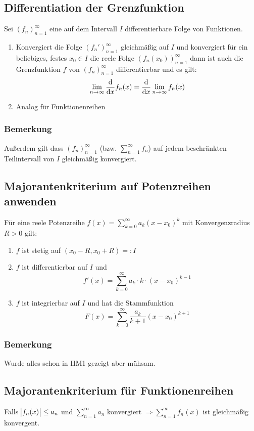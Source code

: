 \subsection{Differentiation der Grenzfunktion}
Sei ${(f_n)}_{n=1}^\infty$ eine auf dem Intervall $I$ differentierbare Folge von
Funktionen.
\begin{enumerate}[label= (\alph*)]
    \item Konvergiert die Folge ${(f_n')}_{n=1}^\infty$ gleichmäßig auf $I$ und konvergiert
    für ein beliebiges, festes $x_0 \in I$ die reele Folge ${(f_n(x_0))}_{n=1}^\infty$
    dann ist auch die Grenzfunktion $f$ von ${(f_n)}_{n=1}^\infty$ differentierbar
    und es gilt:
    \begin{equation*}
        \lim_{n \rightarrow \infty} \dfrac{\text{d}}{\text{d}x} f_n(x) = \dfrac{\text{d}}{\text{d}x} \lim_{n \rightarrow \infty} f_n(x)
    \end{equation*}
    \item Analog für Funktionenreihen
\end{enumerate}

\subsubsection{Bemerkung}
Außerdem gilt dass ${(f_n)}_{n=1}^\infty$ (bzw. $\sum_{n=1}^\infty f_n$) auf jedem
beschränkten Teilintervall von $I$ gleichmäßig konvergiert.

\subsection{Majorantenkriterium auf Potenzreihen anwenden}
Für eine reele Potenzreihe $f(x) = \sum_{k=0}^\infty a_k {(x-x_0)}^k$ mit
Konvergenzradius $R > 0$ gilt:
\begin{enumerate}[label= (\alph*)]
    \item $f$ ist stetig auf $(x_0 - R, x_0 + R) =: I$
    \item $f$ ist differentierbar auf $I$ und
        \begin{equation*}
            f'(x) = \sum_{k=0}^\infty a_k \cdot k \cdot {(x-x_0)}^{k-1}
        \end{equation*}
    \item $f$ ist integrierbar auf $I$ und hat die Stammfunktion
        \begin{equation*}
            F(x) = \sum_{k=0}^\infty \frac{a_k}{k+1} {(x-x_0)}^{k+1}
        \end{equation*}
\end{enumerate}

\subsubsection{Bemerkung}
Wurde alles schon in HM1 gezeigt aber mühsam.

\subsection{Majorantenkriterium für Funktionenreihen}
Falls $\abs{f_n(x)} \leq a_n$ und $\sum_{n=1}^\infty a_n$ konvergiert
$\Rightarrow \sum_{n=1}^\infty f_n(x)$ ist gleichmäßig konvergent.
